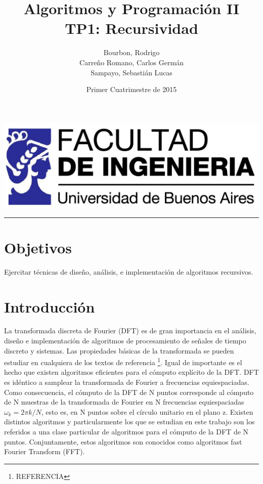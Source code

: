 \documentclass{article}
\begin{document}
\title{Algoritmos y Programación II\\
       TP1: Recursividad}
\author{Bourbon, Rodrigo\\
        Carreño Romano, Carlos Germán\\
        Sampayo, Sebastián Lucas}
\date{Primer Cuatrimestre de 2015}
\maketitle

\begin{center}
  \includegraphics[width=0.5\paperwidth]{Imagenes/logo_fiuba_HD}
  \rule[0.5ex]{0.8\paperwidth}{0.1pt}
\par
\end{center}



\newpage{}
\vfill{}
\tableofcontents{}
\vfill{}
\newpage{}


\section{Objetivos}
  Ejercitar técnicas de diseño, análisis, e implementación de algoritmos recursivos.

\section{Introducción}
La transformada discreta de Fourier (DFT) es de gran importancia en el análisis, diseño e implementación de algoritmos de procesamiento de señales de tiempo discreto y sistemas. Las propiedades básicas de la transformada se pueden estudiar en cualquiera de los textos de referencia \footnote{REFERENCIA}. Igual de importante es el hecho que existen algoritmos eficientes para el cómputo explícito de la DFT.  DFT es idéntico a samplear la transformada de Fourier a frecuencias equiespaciadas. Como consecuencia, el cómputo de la DFT de N puntos corresponde al cómputo de N muestras de la transformada de Fourier en N frecuencias equiespaciadas $\omega_k=2\pi k/N$, esto es, en N puntos sobre el círculo unitario en el plano z. Existen distintos algoritmos y particularmente los que se estudian en este trabajo son los referidos a una clase particular de algoritmos para el cómputo de la DFT de N puntos. Conjuntamente, estos algoritmos son conocidos como algoritmos fast Fourier Transform (FFT).
\end{document}
